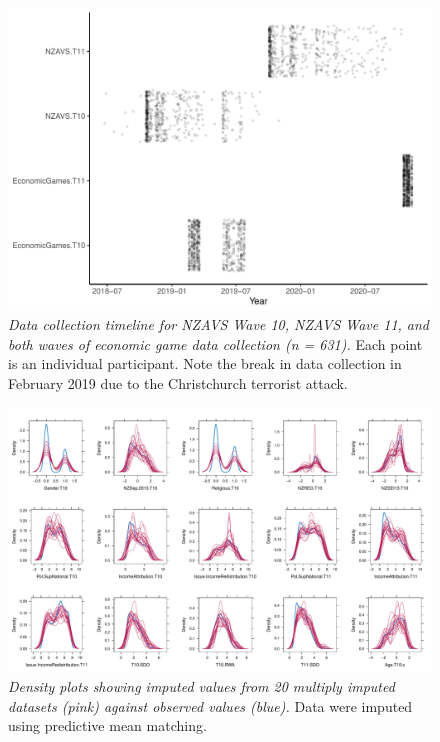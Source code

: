 \documentclass[
  man,floatsintext]{apa6}
\begin{document}
\begin{figure}
\centering
\includegraphics{manuscript_files/figure-latex/timelinePlot-1.pdf}
\caption{\label{fig:timelinePlot}\emph{Data collection timeline for NZAVS Wave 10, NZAVS Wave 11, and both waves of economic game data collection (n = 631).} Each point is an individual participant. Note the break in data collection in February 2019 due to the Christchurch terrorist attack.}
\end{figure}

\newpage



\begin{figure}
\centering
\includegraphics{manuscript_files/figure-latex/impPlot-1.pdf}
\caption{\label{fig:impPlot}\emph{Density plots showing imputed values from 20 multiply imputed datasets (pink) against observed values (blue).} Data were imputed using predictive mean matching.}
\end{figure}
\end{document}
